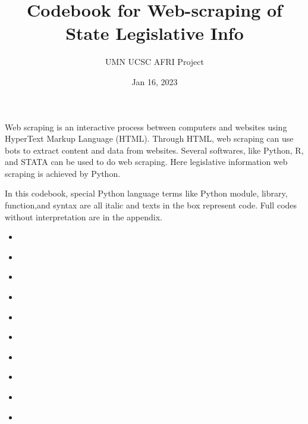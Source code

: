 \documentclass[letterpaper,10pt,english]{jupyterBook}
\title{Codebook for Web-scraping of State Legislative Info}
\date{Jan 16, 2023}
\author{UMN UCSC AFRI Project}
\begin{document}
\pagestyle{empty}
\sphinxmaketitle
\pagestyle{plain}
\sphinxtableofcontents
\pagestyle{normal}
\label{\detokenize{intro::doc}}


\sphinxAtStartPar
Web scraping is an interactive process between computers and websites using HyperText Markup Language (HTML). Through HTML, web scraping can use bots to extract content and data from websites. Several softwares, like Python, R, and STATA can be used to do web scraping. Here legislative information web scraping is achieved by Python.

\sphinxAtStartPar
In this codebook, special Python language terms like Python module, library, function,and syntax are all italic and texts in the box represent code. Full codes without interpretation are in the appendix.
\begin{itemize}
\item {} 
\sphinxAtStartPar
{\hyperref[\detokenize{ch1::doc}]{}}

\item {} 
\sphinxAtStartPar
{\hyperref[\detokenize{ch2::doc}]{}}

\item {} 
\sphinxAtStartPar
{\hyperref[\detokenize{ch3::doc}]{}}

\item {} 
\sphinxAtStartPar
{\hyperref[\detokenize{ch4::doc}]{}}

\item {} 
\sphinxAtStartPar
{\hyperref[\detokenize{ch5::doc}]{}}

\item {} 
\sphinxAtStartPar
{\hyperref[\detokenize{ch6::doc}]{}}

\item {} 
\sphinxAtStartPar
{\hyperref[\detokenize{ch7::doc}]{}}

\item {} 
\sphinxAtStartPar
{\hyperref[\detokenize{ch8::doc}]{}}

\item {} 
\sphinxAtStartPar
{\hyperref[\detokenize{ch9::doc}]{}}

\item {} 
\sphinxAtStartPar
{\hyperref[\detokenize{ch10::doc}]{}}


\end{itemize}
\end{document}
